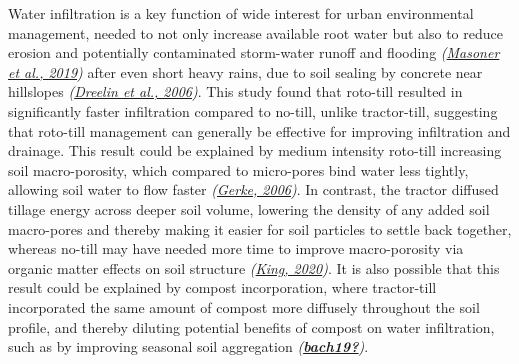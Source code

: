 \documentclass[
  12pt,
]{article}
\begin{document}
Water infiltration is a key function of wide interest for urban environmental management, needed to not only increase available root water but also to reduce erosion and potentially contaminated storm-water runoff and flooding \emph{(\protect\hyperlink{ref-masoner19}{Masoner et al., 2019})} after even short heavy rains, due to soil sealing by concrete near hillslopes \emph{(\protect\hyperlink{ref-dreelin06}{Dreelin et al., 2006})}.
This study found that roto-till resulted in significantly faster infiltration compared to no-till, unlike tractor-till, suggesting that roto-till management can generally be effective for improving infiltration and drainage.
This result could be explained by medium intensity roto-till increasing soil macro-porosity, which compared to micro-pores bind water less tightly, allowing soil water to flow faster \emph{(\protect\hyperlink{ref-gerke06}{Gerke, 2006})}.
In contrast, the tractor diffused tillage energy across deeper soil volume, lowering the density of any added soil macro-pores and thereby making it easier for soil particles to settle back together, whereas no-till may have needed more time to improve macro-porosity via organic matter effects on soil structure \emph{(\protect\hyperlink{ref-king20}{King, 2020})}.
It is also possible that this result could be explained by compost incorporation, where tractor-till incorporated the same amount of compost more diffusely throughout the soil profile, and thereby diluting potential benefits of compost on water infiltration, such as by improving seasonal soil aggregation \emph{(\protect\hyperlink{ref-bach19}{\textbf{bach19?}})}.
\end{document}
